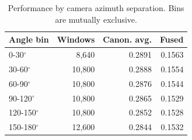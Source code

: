 \begin{table}[t]
\centering
\caption{Performance by camera azimuth separation. Bins are mutually exclusive.}
\label{tab:view_angle}
\small
\begin{tabular}{lrrr}
\toprule
Angle bin & Windows & Canon. avg. & Fused \\
\midrule
0-30$^\circ$ & 8,640 & 0.2891 & 0.1563 \\
30-60$^\circ$ & 10,800 & 0.2888 & 0.1554 \\
60-90$^\circ$ & 10,800 & 0.2876 & 0.1544 \\
90-120$^\circ$ & 10,800 & 0.2865 & 0.1529 \\
120-150$^\circ$ & 10,800 & 0.2852 & 0.1528 \\
150-180$^\circ$ & 12,600 & 0.2844 & 0.1532 \\
\bottomrule
\end{tabular}
\end{table}
